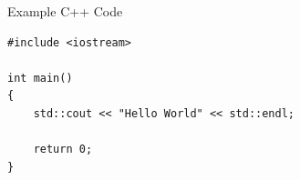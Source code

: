\begin{frame}[fragile]{Example C++ Code}
	
	\begin{lstlisting}
#include <iostream>

int main()
{
	std::cout << "Hello World" << std::endl;
	
	return 0;
}
	\end{lstlisting}
	
\end{frame}
